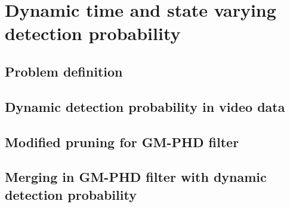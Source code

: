 \chapter{Dynamic time and state varying detection probability}
\section{Problem definition}
\section{Dynamic detection probability in video data}
\section{Modified pruning for GM-PHD filter}
\section{Merging in GM-PHD filter with dynamic detection probability}